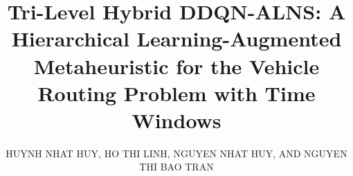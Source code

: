 \documentclass{ieeeaccess}
\begin{document}

\title{Tri-Level Hybrid DDQN-ALNS: A Hierarchical Learning-Augmented Metaheuristic for the Vehicle Routing Problem with Time Windows}

\author{\uppercase{Huynh Nhat Huy}, \uppercase{Ho Thi Linh}, \uppercase{Nguyen Nhat Huy}, \uppercase{and Nguyen Thi Bao Tran}}

\address[1]{Faculty of Information Technology, Ton Duc Thang University, Ho Chi Minh City, Vietnam (e-mail: huynhnthuy@tdtu.edu.vn)}
\address[2]{Natural Language Processing and Knowledge Discovery Research Group, Faculty of Information Technology, Ton Duc Thang University, Ho Chi Minh City, Vietnam (e-mail: hotlinh@tdtu.edu.vn)}
\address[3]{Mindx, Ho Chi Minh City, Vietnam (e-mail: huynguyenwork14@gmail.com)}
\address[4]{Vinsmart future, Ho Chi Minh City, Vietnam (e-mail: tranntb.se@gmail.com)}




\titlepgskip=-15pt
\end{document}
